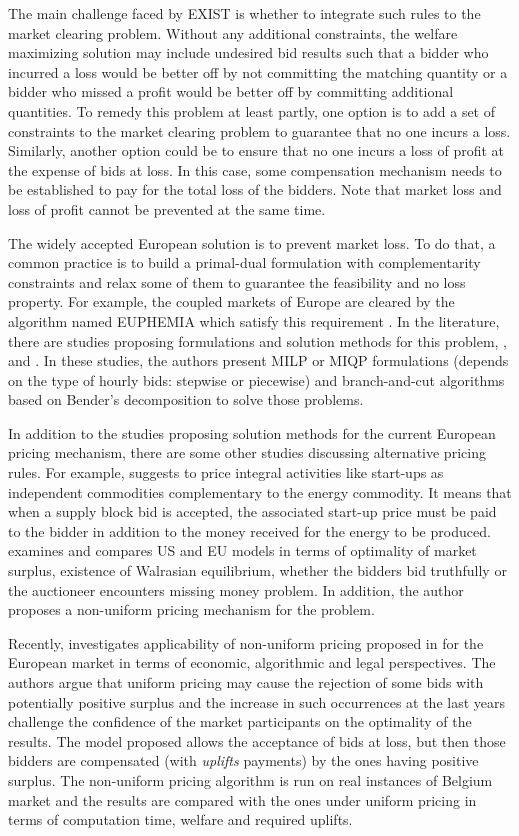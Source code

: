 \documentclass[conference]{IEEEtran}
\begin{document}
The main challenge faced by EXIST is whether to integrate such rules to the market clearing problem. Without any additional constraints, the welfare maximizing solution may include undesired bid results such that a bidder who incurred a loss would be better off by not committing the matching quantity or a bidder who missed a profit would be better off by committing additional quantities. To remedy this problem at least partly, one option is to add a set of constraints to the market clearing problem to guarantee that no one incurs a loss. Similarly, another option could be to ensure that no one incurs a loss of profit at the expense of bids at loss. In this case, some compensation mechanism needs to be established to pay for the total loss of the bidders. Note that market loss and loss of profit cannot be prevented at the same time.

The widely accepted European solution is to prevent market loss. To do that, a common practice is to build a primal-dual formulation with complementarity constraints and relax some of them to guarantee the feasibility and no loss property. For example, the coupled markets of Europe are cleared by the algorithm named EUPHEMIA which satisfy this requirement \cite{euphemia}. In the literature, there are studies proposing formulations and solution methods for this problem, \cite{martin2014strict}, \cite{madani_vyve_2015} and \cite{madani2014minimizing}. In these studies, the authors present MILP or MIQP formulations (depends on the type of hourly bids: stepwise or piecewise) and branch-and-cut algorithms based on Bender's decomposition to solve those problems. 

In addition to the studies proposing solution methods for the current European pricing mechanism, there are some other studies discussing alternative pricing rules. For example, \cite{o2005efficient} suggests to price integral activities like start-ups as independent commodities complementary to the energy commodity. It means that when a supply block bid is accepted, the associated start-up price must be paid to the bidder in addition to the money received for the energy to be produced. \cite{van2011linear} examines and compares US and EU models in terms of optimality of market surplus, existence of Walrasian equilibrium, whether the bidders bid truthfully or the auctioneer encounters missing money problem. In addition, the author proposes a non-uniform pricing mechanism for the problem.

Recently, \cite{madani2016non} investigates applicability of non-uniform pricing proposed in \cite{van2011linear} for the European market in terms of economic, algorithmic and legal perspectives. The authors argue that uniform pricing may cause the rejection of some bids with potentially positive surplus and the increase in such occurrences at the last years challenge the confidence of the market participants on the optimality of the results. The model proposed allows the acceptance of bids at loss, but then those bidders are compensated (with \textit{uplifts} payments) by the ones having positive surplus. The non-uniform pricing algorithm is run on real instances of Belgium market and the results are compared with the ones under uniform pricing in terms of computation time, welfare and required uplifts. 
\end{document}
